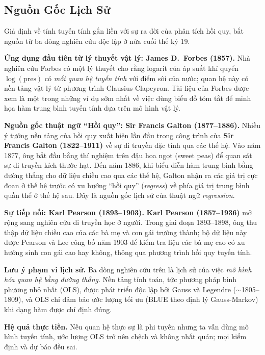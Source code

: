 \subsection{Nguồn Gốc Lịch Sử}

Giả định về tính tuyến tính gắn liền với sự ra đời của phân tích hồi quy, bắt nguồn từ ba dòng nghiên cứu độc lập ở nửa cuối thế kỷ 19.

\textbf{Ứng dụng đầu tiên từ lý thuyết vật lý: James D.\ Forbes (1857).}
Nhà nghiên cứu Forbes có một lý thuyết cho rằng logarit của áp suất khí quyển $\log(\text{pres})$ có \textit{mối quan hệ tuyến tính} với điểm sôi của nước; quan hệ này có nền tảng vật lý từ phương trình Clausius-Clapeyron. Tài liệu của Forbes được xem là một trong những ví dụ sớm nhất về việc dùng biểu đồ tóm tắt để minh họa hàm trung bình tuyến tính dựa trên mô hình vật lý.

\textbf{Nguồn gốc thuật ngữ ``Hồi quy'': Sir Francis Galton (1877--1886).}
Nhiều ý tưởng nền tảng của hồi quy xuất hiện lần đầu trong công trình của \textbf{Sir Francis Galton (1822--1911)} về sự di truyền đặc tính qua các thế hệ. Vào năm 1877, ông bắt đầu bằng thí nghiệm trên đậu hoa ngọt (sweet peas) để quan sát sự di truyền kích thước hạt. Đến năm 1886, khi biểu diễn hàm trung bình bằng đường thẳng cho dữ liệu chiều cao qua các thế hệ, Galton nhận ra các giá trị cực đoan ở thế hệ trước có xu hướng ``hồi quy'' (\textit{regress}) về phía giá trị trung bình quần thể ở thế hệ sau. Đây là nguồn gốc lịch sử của thuật ngữ \textit{regression}.

\textbf{Sự tiếp nối: Karl Pearson (1893--1903).}
\textbf{Karl Pearson (1857--1936)} mở rộng sang nghiên cứu di truyền học ở người. Trong giai đoạn 1893--1898, ông thu thập dữ liệu chiều cao của các bà mẹ và con gái trưởng thành; bộ dữ liệu này được Pearson và Lee công bố năm 1903 để kiểm tra liệu các bà mẹ cao có xu hướng sinh con gái cao hay không, thông qua phương trình hồi quy tuyến tính.

\textbf{Lưu ý phạm vi lịch sử.} Ba dòng nghiên cứu trên là lịch sử của việc \textit{mô hình hóa quan hệ bằng đường thẳng}. Nền tảng tính toán, tức phương pháp bình phương nhỏ nhất (OLS), được phát triển độc lập bởi Gauss và Legendre ($\sim$1805--1809), và OLS chỉ đảm bảo ước lượng tối ưu (BLUE theo định lý Gauss-Markov) khi dạng hàm được chỉ định đúng.

\textbf{Hệ quả thực tiễn.} Nếu quan hệ thực sự là phi tuyến nhưng ta vẫn dùng mô hình tuyến tính, ước lượng OLS trở nên chệch và không nhất quán; mọi kiểm định và dự báo đều sai.

